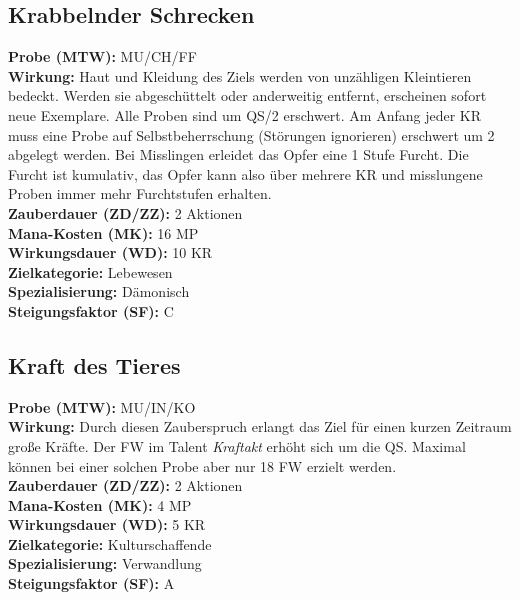 \subsection{Krabbelnder Schrecken}
\label{chap:krabbelnder_schrecken}
\textbf{Probe (MTW):} MU/CH/FF \\
\textbf{Wirkung:} Haut und Kleidung des Ziels werden von unzähligen Kleintieren bedeckt. Werden sie abgeschüttelt oder anderweitig entfernt, erscheinen sofort neue Exemplare. Alle Proben sind um QS/2 erschwert. Am Anfang jeder KR muss eine Probe auf Selbstbeherrschung (Störungen ignorieren) erschwert um 2 abgelegt werden. Bei Misslingen erleidet das Opfer eine 1 Stufe Furcht. Die Furcht ist kumulativ, das Opfer kann also über mehrere KR und misslungene Proben immer mehr Furchtstufen erhalten.\\
\textbf{Zauberdauer (ZD/ZZ):} 2 Aktionen \\
\textbf{Mana-Kosten (MK):} 16 MP \\
\textbf{Wirkungsdauer (WD):} 10 KR \\
\textbf{Zielkategorie:} Lebewesen \\
\textbf{Spezialisierung:} Dämonisch \\
\textbf{Steigungsfaktor (SF):} C


\subsection{Kraft des Tieres}
\label{chap:kraft_des_tieres}
\textbf{Probe (MTW):} MU/IN/KO \\
\textbf{Wirkung:} Durch diesen Zauberspruch erlangt das Ziel für einen kurzen Zeitraum große Kräfte. Der FW im Talent \textit{Kraftakt} erhöht sich um die QS. Maximal können bei einer solchen Probe aber nur 18 FW erzielt werden.\\
\textbf{Zauberdauer (ZD/ZZ):} 2 Aktionen \\
\textbf{Mana-Kosten (MK):} 4 MP \\
\textbf{Wirkungsdauer (WD):} 5 KR \\
\textbf{Zielkategorie:} Kulturschaffende \\
\textbf{Spezialisierung:} Verwandlung \\
\textbf{Steigungsfaktor (SF):} A


